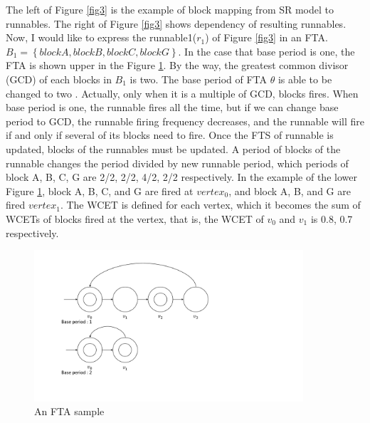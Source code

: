 \documentclass[conference,compsoc]{IEEEtran}
\begin{document}
The left of Figure \ref{fig3} is the example of block mapping from SR model to runnables.
The right of Figure \ref{fig3} shows dependency of resulting runnables.
Now, I would like to express  the runnable1($r_1$) of Figure \ref{fig3} in an FTA.
$B_1 = \left\{block A, block B, block C, block G\right\}$.
In the case that base period is one, the FTA is shown upper in the Figure \ref{fig5}.
By the way, the greatest common divisor (GCD) of each blocks in $B_1$ is two.
The base period of FTA $\theta$ is able to be changed to two .
Actually, only when it is a multiple of GCD, blocks fires.
When base period is one, the runnable fires all the time, but if we can change base period to GCD, the runnable firing frequency decreases, and the runnable will fire if and only if several of its blocks need to fire. 
 Once the FTS of runnable is updated, blocks of the runnables must be updated.
A period of blocks of the runnable changes the period divided by new runnable period, which periods of block A, B, C, G are 2/2, 2/2, 4/2, 2/2 respectively.
In the example of the lower Figure \ref{fig5}, block A, B, C, and G are fired at $vertex_0$, and block A, B, and G are fired $vertex_1$.  
The WCET is defined for each vertex, which it becomes the sum of WCETs of blocks fired at the vertex, that is, the WCET of $v_0$ and $v_1$ is 0.8, 0.7 respectively.


\begin{figure}
	\centering
	\includegraphics[width=10cm,clip]{figure9.pdf}
	\caption{An FTA sample}
	\label{fig5}
\end{figure}
\end{document}
